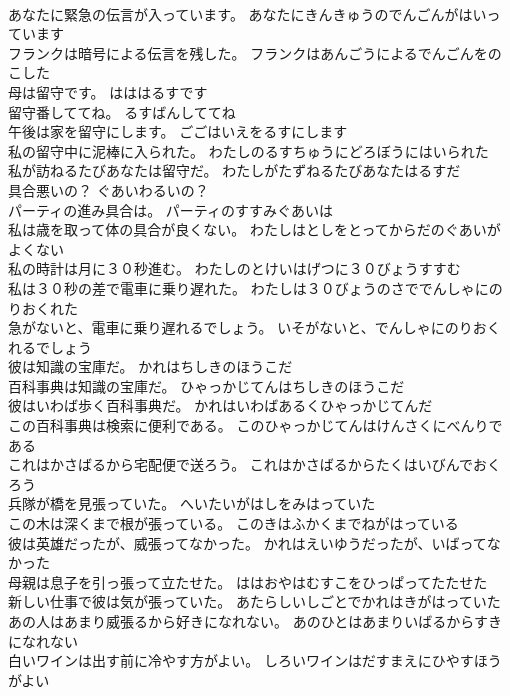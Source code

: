 \documentclass[8pt]{extreport}
\begin{document}
\begin{CJK}{UTF8}{min}
\\	あなたに緊急の伝言が入っています。	あなたにきんきゅうのでんごんがはいっています 
\\	フランクは暗号による伝言を残した。	フランクはあんごうによるでんごんをのこした 
\\	母は留守です。	はははるすです 
\\	留守番しててね。	るすばんしててね 
\\	午後は家を留守にします。	ごごはいえをるすにします 
\\	私の留守中に泥棒に入られた。	わたしのるすちゅうにどろぼうにはいられた 
\\	私が訪ねるたびあなたは留守だ。	わたしがたずねるたびあなたはるすだ 
\\	具合悪いの？	ぐあいわるいの？ 
\\	パーティの進み具合は。	パーティのすすみぐあいは 
\\	私は歳を取って体の具合が良くない。	わたしはとしをとってからだのぐあいがよくない 
\\	私の時計は月に３０秒進む。	わたしのとけいはげつに３０びょうすすむ 
\\	私は３０秒の差で電車に乗り遅れた。	わたしは３０びょうのさででんしゃにのりおくれた 
\\	急がないと、電車に乗り遅れるでしょう。	いそがないと、でんしゃにのりおくれるでしょう 
\\	彼は知識の宝庫だ。	かれはちしきのほうこだ 
\\	百科事典は知識の宝庫だ。	ひゃっかじてんはちしきのほうこだ 
\\	彼はいわば歩く百科事典だ。	かれはいわばあるくひゃっかじてんだ 
\\	この百科事典は検索に便利である。	このひゃっかじてんはけんさくにべんりである 
\\	これはかさばるから宅配便で送ろう。	これはかさばるからたくはいびんでおくろう 
\\	兵隊が橋を見張っていた。	へいたいがはしをみはっていた 
\\	この木は深くまで根が張っている。	このきはふかくまでねがはっている 
\\	彼は英雄だったが、威張ってなかった。	かれはえいゆうだったが、いばってなかった 
\\	母親は息子を引っ張って立たせた。	ははおやはむすこをひっぱってたたせた 
\\	新しい仕事で彼は気が張っていた。	あたらしいしごとでかれはきがはっていた 
\\	あの人はあまり威張るから好きになれない。	あのひとはあまりいばるからすきになれない 
\\	白いワインは出す前に冷やす方がよい。	しろいワインはだすまえにひやすほうがよい 

\end{CJK}
\end{document}
